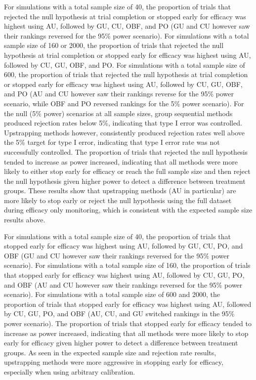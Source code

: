 \documentclass[Afour,sageh,times,square,numbers]{sagej}
\begin{document}
For simulations with a total sample size of 40, the proportion of trials that rejected the null hypothesis at trial completion or stopped early for efficacy was highest using AU, followed by GU, CU, OBF, and PO (GU and CU however saw their rankings reversed for the 95\% power scenario).  For simulations with a total sample size of 160 or 2000, the proportion of trials that rejected the null hypothesis at trial completion or stopped early for efficacy was highest using AU, followed by CU, GU, OBF, and PO.  For simulations with a total sample size of 600, the proportion of trials that rejected the null hypothesis at trial completion or stopped early for efficacy was highest using AU, followed by CU, GU, OBF, and PO (AU and CU however saw their rankings reverse for the 95\% power scenario, while OBF and PO reversed rankings for the 5\% power scenario).  For the null (5\% power) scenarios at all sample sizes, group sequential methods produced rejection rates below 5\%, indicating that type I error was controlled.  Upstrapping methods however, consistently produced rejection rates well above the 5\% target for type I error, indicating that type I error rate was not successfully controlled.  The proportion of trials that rejected the null hypothesis tended to increase as power increased, indicating that all methods were more likely to either stop early for efficacy or reach the full sample size and then reject the null hypothesis given higher power to detect a difference between treatment groups.  These results show that upstrapping methods (AU in particular) are more likely to stop early or reject the null hypothesis using the full dataset during efficacy only monitoring, which is consistent with the expected sample size results above.

For simulations with a total sample size of 40, the proportion of trials that stopped early for efficacy was highest using AU, followed by GU, CU, PO, and OBF (GU and CU however saw their rankings reversed for the 95\% power scenario).  For simulations with a total sample size of 160, the proportion of trials that stopped early for efficacy was highest using AU, followed by CU, GU, PO, and OBF (AU and CU however saw their rankings reversed for the 95\% power scenario).  For simulations with a total sample size of 600 and 2000, the proportion of trials that stopped early for efficacy was highest using AU, followed by CU, GU, PO, and OBF (AU, CU, and GU switched rankings in the 95\% power scenario).  The proportion of trials that stopped early for efficacy tended to increase as power increased, indicating that all methods were more likely to stop early for efficacy given higher power to detect a difference between treatment groups.  As seen in the expected sample size and rejection rate results, upstrapping methods were more aggressive in stopping early for efficacy, especially when using arbitrary calibration.
\end{document}
